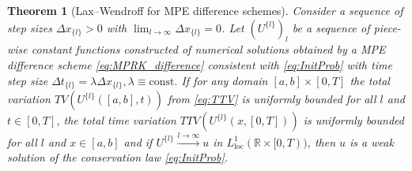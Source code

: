 \documentclass[final,11pt, times, linenumber, nopreprintline]{elsarticle}
\newcommand{\R}{\mathbb{R}}
\newtheorem{thm}{Theorem}
\begin{document}
\begin{thm}[Lax--Wendroff for MPE difference schemes]\label{th_Main_MP}
    Consider a sequence of step sizes $\Delta x_{\{l\}} > 0$ with  $ \lim_{l{ \rightarrow \infty}} \Delta x_{\{l\}} = 0$. Let $\left( U^{\{l\}} \right)_l $ be a sequence of piece-wise constant functions constructed of numerical solutions obtained by a MPE difference scheme \eqref{eq:MPRK_difference} consistent with \eqref{eq:InitProb} with time step size $\Delta t_{\{l\}} = \lambda \Delta x_{\{l\}}, \lambda \equiv \mathrm{const}.$ If for any domain $[a,b]\times [0,T]$ the total variation $TV \left(U^{\{l\}}([a,b], t)\right)$ from \eqref{eq:TTV} is uniformly bounded for all $l$ and $t \in [0,T]$, the total time variation $TTV\left(U^{\{l\}}(x, [0,T])\right)$ is uniformly bounded for all $l$ and $x \in [a,b]$ and if $U^{\{l\}}\xrightarrow{l \rightarrow \infty} u$ in $L^1_{\mathrm{loc}}(\R\times [0,T))$, then $u$ is a weak solution of the conservation law \eqref{eq:InitProb}.
    \label{thm:LWMP}
\end{thm}
\end{document}
